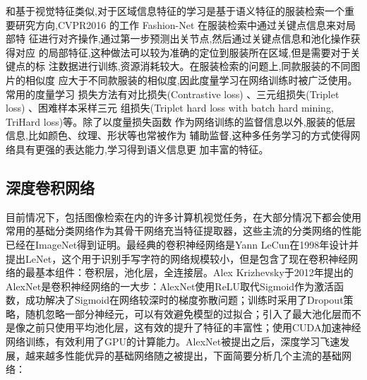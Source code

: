 和基于视觉特征类似,对于区域信息特征的学习是基于语义特征的服装检索一个重
要研究方向,CVPR2016 的工作 Fashion-Net\cite{liu2016deepfashion} 在服装检索中通过关键点信息来对局部特
征进行对齐操作,通过第一步预测出关节点,然后通过关键点信息和池化操作获得对应
的局部特征,这种做法可以较为准确的定位到服装所在区域,但是需要对于关键点的标
注数据进行训练,资源消耗较大。在服装检索的问题上,同款服装的不同图片的相似度
应大于不同款服装的相似度,因此度量学习在网络训练时被广泛使用。常用的度量学习
损失方法有对比损失(Contrastive loss)
、三元组损失(Triplet loss)
、困难样本采样三元
组损失(Triplet hard loss with batch hard mining, TriHard loss)等。除了以度量损失函数
作为网络训练的监督信息以外,服装的低层信息,比如颜色、纹理、形状等也常被作为
辅助监督,这种多任务学习的方式使得网络具有更强的表达能力,学习得到语义信息更
加丰富的特征。

\subsection{深度卷积网络}
目前情况下，包括图像检索在内的许多计算机视觉任务，在大部分情况下都会使用常用的基础分类网络作为其骨干网络充当特征提取器，这些主流的分类网络的性能已经在ImageNet得到证明。最经典的卷积神经网络是Yann LeCun在1998年设计并提出LeNet，这个用于识别手写字符的网络规模较小，但是包含了现在卷积神经网络的最基本组件：卷积层，池化层，全连接层。Alex Krizhevsky于2012年提出的AlexNet是卷积神经网络的一大步：AlexNet使用ReLU取代Sigmoid作为激活函数，成功解决了Sigmoid在网络较深时的梯度弥散问题；训练时采用了Dropout策略，随机忽略一部分神经元，可以有效避免模型的过拟合；引入了最大池化层而不是像之前只使用平均池化层，这有效的提升了特征的丰富性；使用CUDA加速神经网络训练，有效利用了GPU的计算能力。AlexNet被提出之后，深度学习飞速发展，越来越多性能优异的基础网络随之被提出，下面简要分析几个主流的基础网络：
